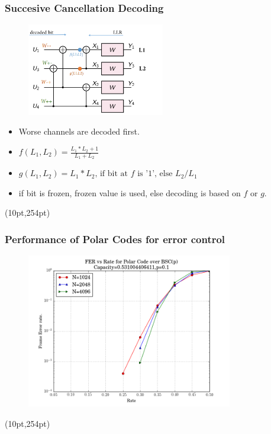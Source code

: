 \documentclass[xcolor=dvipsnames]{beamer}
\newcommand\hyperback[1]{%
  \begin{textblock*}{\paperwidth}(10pt,254pt)
    \raggedright #1\hspace{.5em}
  \end{textblock*}}
\begin{document}
\begin{frame}[label = polardecode]
\frametitle{Succesive Cancellation Decoding}
\begin{figure}
\centering
\includegraphics[width=6cm]{./scdecode.png}
\end{figure}
\begin{itemize}
\item Worse channels are decoded first. 
\item $f(L_1,L_2)=\frac{L_1*L_2+1}{L_1+L_2}$
\item $g(L_1,L_2)=L_1*L_2 \text{, if bit at }f\text{ is '}1\text{', else }L_2/L_1$
\item if bit is frozen, frozen value is used, else decoding is based on $f$ or $g$.
\end{itemize}
\hyperback{\hyperlink{polarencodedecode}{}}
\end{frame}
\begin{frame}[label = polarperformance]
\frametitle{Performance of Polar Codes for error control}
\begin{figure}
\centering
\includegraphics[width=9cm]{./fer.png}
\end{figure}
\hyperback{\hyperlink{polarencodedecode}{}}
\end{frame}
\end{document}

